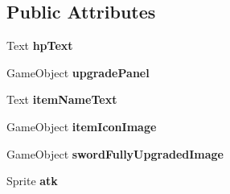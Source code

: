 \subsection*{Public Attributes}
\begin{DoxyCompactItemize}
\item 
\mbox{\label{class_inventory_abd3af35db0c0049ce91eaa99b1798a69}} 
Text {\bfseries hp\+Text}
\item 
\mbox{\label{class_inventory_a4382ed8c55fa1899bf7a981ffac00523}} 
Game\+Object {\bfseries upgrade\+Panel}
\item 
\mbox{\label{class_inventory_aff3bb1bee86c2916dd649bf623cbb963}} 
Text {\bfseries item\+Name\+Text}
\item 
\mbox{\label{class_inventory_ae035b7a3471724276238be3ec5d4769f}} 
Game\+Object {\bfseries item\+Icon\+Image}
\item 
\mbox{\label{class_inventory_a268e4f39b1a158144b18d8560d4c2ef2}} 
Game\+Object {\bfseries sword\+Fully\+Upgraded\+Image}
\item 
\mbox{\label{class_inventory_a8c34a2d39aab6ff22ec36e41763e2e22}} 
Sprite {\bfseries atk}
\end{DoxyCompactItemize}

